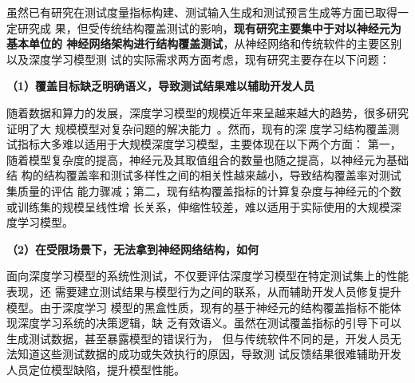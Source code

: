     
    
    







虽然已有研究在测试度量指标构建、测试输入生成和测试预言生成等方面已取得一定研究成
果，但受传统结构覆盖测试的影响，\textbf{现有研究主要集中于对以神经元为基本单位的
神经网络架构进行结构覆盖测试}，从神经网络和传统软件的主要区别以及深度学习模型测
试的实际需求两方面考虑，现有研究主要存在以下问题：





\textbf{（1）覆盖目标缺乏明确语义，导致测试结果难以辅助开发人员}

随着数据和算力的发展，深度学习模型的规模近年来呈越来越大的趋势，很多研究证明了大
规模模型对复杂问题的解决能力~\cite{kenton2019bert,he2021masked}。然而，现有的深
度学习结构覆盖测试指标大多难以适用于大规模深度学习模型，主要体现在以下两个方面：
第一，随着模型复杂度的提高，神经元及其取值组合的数量也随之提高，以神经元为基础结
构的结构覆盖率和测试多样性之间的相关性越来越小，导致结构覆盖率对测试集质量的评估
能力骤减；第二，现有结构覆盖指标的计算复杂度与神经元的个数或训练集的规模呈线性增
长关系，伸缩性较差，难以适用于实际使用的大规模深度学习模型。


\textbf{（2）在受限场景下，无法拿到神经网络结构，如何}

面向深度学习模型的系统性测试，不仅要评估深度学习模型在特定测试集上的性能表现，还
需要建立测试结果与模型行为之间的联系，从而辅助开发人员修复提升模型。由于深度学习
模型的黑盒性质，现有的基于神经元的结构覆盖指标不能体现深度学习系统的决策逻辑，缺
乏有效语义。虽然在测试覆盖指标的引导下可以生成测试数据，甚至暴露模型的错误行为，
但与传统软件不同的是，开发人员无法知道这些测试数据的成功或失效执行的原因，导致测
试反馈结果很难辅助开发人员定位模型缺陷，提升模型性能。

